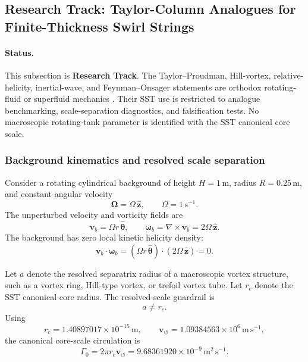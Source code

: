 
\subsection{Research Track: Taylor-Column Analogues for Finite-Thickness Swirl Strings}
\label{sec:taylor_column_finite_thickness_swirl_strings}

\providecommand{\rhoF}{\rho_{\!f}}
\providecommand{\vSwirl}{\mathbf{v}_{\!\boldsymbol{\circlearrowleft}}}
\providecommand{\rc}{r_c}
\providecommand{\GammaK}{\Gamma_K}
\providecommand{\GammaZero}{\Gamma_0}
\providecommand{\Om}{\Omega}
\providecommand{\Ht}{\mathcal{H}_{\times}}

\paragraph{Status.}
This subsection is \textbf{Research Track}.  The Taylor--Proudman,
Hill-vortex, relative-helicity, inertial-wave, and Feynman--Onsager statements
are orthodox rotating-fluid or superfluid mechanics
\cite{Proudman1916,Taylor1922,Batchelor1967,Greenspan1968,Hill1894,Onsager1949,Feynman1955}.
Their SST use is restricted to analogue benchmarking, scale-separation
diagnostics, and falsification tests.  No macroscopic rotating-tank parameter is
identified with the SST canonical core scale.

\subsubsection{Background kinematics and resolved scale separation}

Consider a rotating cylindrical background of height
\(H=1\,\mathrm m\), radius \(R=0.25\,\mathrm m\), and constant angular velocity
\[
\boldsymbol{\Omega}=\Omega\,\hat{\mathbf z},
\qquad
\Omega=1\,\mathrm{s^{-1}}.
\]
The unperturbed velocity and vorticity fields are
\[
\mathbf v_b=\Omega r\,\hat{\boldsymbol\theta},
\qquad
\boldsymbol\omega_b=\nabla\times\mathbf v_b
=2\Omega\,\hat{\mathbf z}.
\]
The background has zero local kinetic helicity density:
\[
\mathbf v_b\cdot\boldsymbol\omega_b
=(\Omega r\,\hat{\boldsymbol\theta})\cdot(2\Omega\,\hat{\mathbf z})=0.
\]

Let \(a\) denote the resolved separatrix radius of a macroscopic vortex
structure, such as a vortex ring, Hill-type vortex, or trefoil vortex tube.
Let \(r_c\) denote the SST canonical core radius.  The resolved-scale guardrail is
\[
\boxed{a\neq r_c.}
\]
Using
\[
r_c=1.40897017\times10^{-15}\,\mathrm m,
\qquad
\vSwirl=1.09384563\times10^6\,\mathrm{m\,s^{-1}},
\]
the canonical core-scale circulation is
\[
\Gamma_0=2\pi r_c\vSwirl
=9.68361920\times10^{-9}\,\mathrm{m^2\,s^{-1}}.
\]

